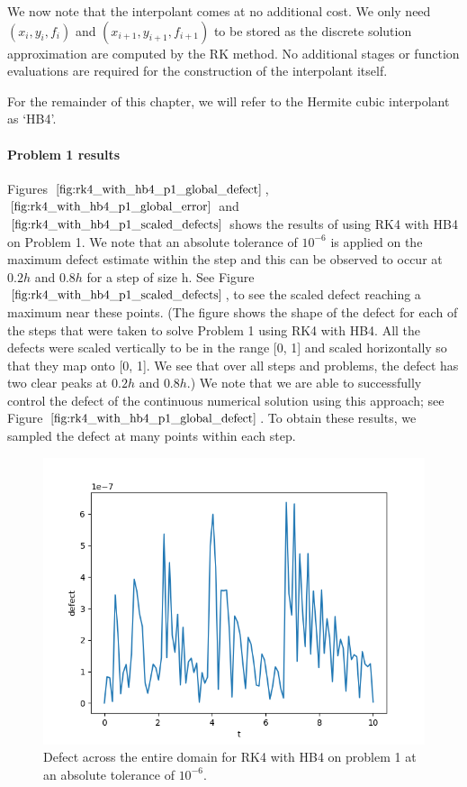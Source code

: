 We now note that the interpolant comes at no additional cost. We only need $(x_i, y_i, f_i)$ and $(x_{i + 1}, y_{i + 1}, f_{i + 1})$ to be stored as the discrete solution approximation are computed by the RK method. No additional stages or function evaluations are required for the construction of the interpolant itself. 

For the remainder of this chapter, we will refer to the Hermite cubic interpolant as `HB4'.

\paragraph{Problem 1 results}
Figures $\ref{fig:rk4_with_hb4_p1_global_defect}$, $\ref{fig:rk4_with_hb4_p1_global_error}$ and $\ref{fig:rk4_with_hb4_p1_scaled_defects}$ shows the results of using RK4 with HB4 on Problem 1. We note that an absolute tolerance of $10^{-6}$ is applied on the maximum defect estimate within the step and this can be observed to occur at $0.2h$ and $0.8h$ for a step of size h. See Figure $\ref{fig:rk4_with_hb4_p1_scaled_defects}$, to see the scaled defect reaching a maximum near these points. (The figure shows the shape of the defect for each of the steps that were taken to solve Problem 1 using RK4 with HB4. All the defects were scaled vertically to be in the range [0, 1] and scaled horizontally so that they map onto [0, 1]. We see that over all steps and problems, the defect has two clear peaks at $0.2h$ and $0.8h$.) We note that we are able to successfully control the defect of the continuous numerical solution using this approach; see Figure $\ref{fig:rk4_with_hb4_p1_global_defect}$. To obtain these results, we sampled the defect at many points within each step.

\begin{figure}[H]
\centering
\includegraphics[width=0.7\linewidth]{./figures/rk4_with_hb4_p1_global_defect}
\caption{Defect across the entire domain for RK4 with HB4 on problem 1 at an absolute tolerance of $10^{-6}$.}
\label{fig:rk4_with_hb4_p1_global_defect}
\end{figure}

